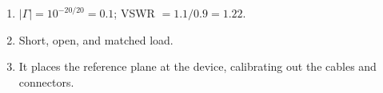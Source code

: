 \begin{enumerate}[leftmargin=1.6em,itemsep=2pt]
\item $|\Gamma| = 10^{-20/20} = 0.1$; VSWR $= 1.1/0.9 = 1.22$.
\item Short, open, and matched load.
\item It places the reference plane at the device, calibrating out the cables and connectors.
\end{enumerate}
